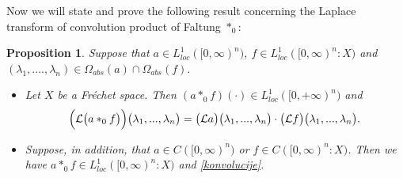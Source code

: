 \documentclass{amsart}
\newtheorem{prop}[thm]{Proposition}
\theoremstyle{definition}
\theoremstyle{remark}
\numberwithin{equation}{section}
\begin{document}
Now we will state and prove the following result concerning the Laplace transform of convolution product of Faltung $\ast_{0}:$

\begin{prop}\label{lapkonv}
Suppose that $a\in L_{loc}^1([0,\infty)^{n})$, $f\in L_{loc}^1([0,\infty)^{n}:X)$ and $(\lambda_{1},....,\lambda_{n})\in \Omega_{abs}(a) \cap \Omega_{abs}(f).$
\begin{itemize}
\item[(i)] Let $X$ be a Fr\' echet space. Then $(a\ast_{0}f)(\cdot)\in L_{loc}^{1}([0,+\infty)^{n})$ and  
\begin{align}\label{konvolucije}
\Bigl({\mathcal L}\bigl(a \ast_{0} f\bigr)\Bigr)\bigl(\lambda_{1},...,\lambda_{n}\bigr)=\bigl({\mathcal L}a\bigr)\bigl(\lambda_{1},...,\lambda_{n}\bigr) \cdot \bigl({\mathcal L}f\bigr) \bigl(\lambda_{1},...,\lambda_{n}\bigr).
\end{align}
\item[(ii)] Suppose, in addition, that
$a\in C([0,\infty)^{n})$ or $f\in C([0,\infty)^{n}:X)$. Then we have $a\ast_{0}f\in  L_{loc}^1([0,\infty)^{n}:X)$ and \eqref{konvolucije}.
\end{itemize}
\end{prop}
\end{document}
